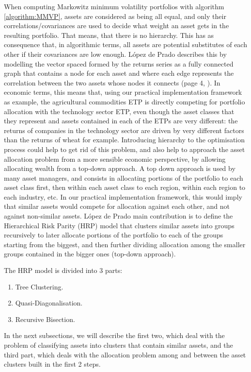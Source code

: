     When computing Markowitz minimum volatility portfolios with algorithm \ref{algorithm:MMVP}, assets are considered as being all equal, and only their correlations/covariances are used to decide what weight an asset gets in the resulting portfolio. That means, that there is no hierarchy. This has as consequence that, in algorithmic terms, all assets are potential substitutes of each other if their covariances are low enough. López de Prado describes this by modelling the vector spaced formed by the returns series as a fully connected graph that contains a node for each asset and where each edge represents the correlation between the two assets whose nodes it connects (page 4, \cite{lopezmain}). In economic terms, this means that, using our practical implementation framework as example, the agricultural commodities ETP is directly competing for portfolio allocation with the technology sector ETP, even though the asset classes that they represent and assets contained in each of the ETPs are very different: the returns of companies in the technology sector are driven by very different factors than the returns of wheat for example. Introducing hierarchy to the optimisation process could help to get rid of this problem, and also help to approach the asset allocation problem from a more sensible economic perspective, by allowing allocating wealth from a top-down approach. A top down approach is used by many asset managers, and consists in allocating portions of the portfolio to each asset class first, then within each asset class to each region, within each region to each industry, etc. In our practical implementation framework, this would imply that similar assets would compete for allocation against each other, and not against non-similar assets. López de Prado main contribution is to define the Hierarchical Risk Parity (HRP) model that clusters similar assets into groups recursively to later allocate portions of the portfolio to each of the groups starting from the biggest, and then further dividing allocation among the smaller groups contained in the bigger ones (top-down approach).
    
    The HRP model is divided into 3 parts:
    \begin{enumerate}
        \item Tree Clustering.
        \item Quasi-Diagonalisation.
        \item Recursive Bisection.
    \end{enumerate}
    
    In the next subsections, we will describe the first two, which deal with the problem of classifying assets into clusters that contain similar assets, and the third part, which deals with the allocation problem among and between the asset clusters built in the first 2 steps.
    
